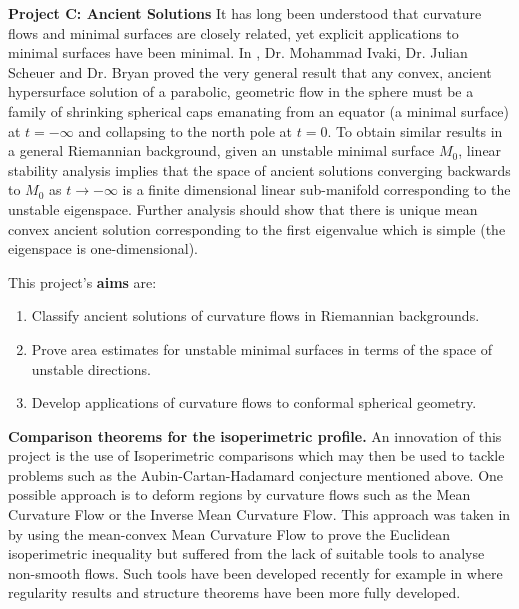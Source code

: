 \documentclass[12pt]{amsart}
\begin{document}
\noindent\textbf{Project C: Ancient Solutions}
\label{sec-2-3}
It has long been understood that curvature flows and minimal surfaces are closely related, yet explicit applications to minimal surfaces have been minimal. In \cite{2016arXiv160401694B}, Dr. Mohammad Ivaki, Dr. Julian Scheuer and Dr. Bryan proved the very general result that any convex, ancient hypersurface solution of a parabolic, geometric flow in the sphere must be a family of shrinking spherical caps emanating from an equator (a minimal surface) at $t=-\infty$ and collapsing to the north pole at $t=0$. To obtain similar results in a general Riemannian background, given an unstable minimal surface $M_0$, linear stability analysis implies that the space of ancient solutions converging backwards to $M_0$ as $t\to-\infty$ is a finite dimensional linear sub-manifold corresponding to the unstable eigenspace. Further analysis should show that there is unique mean convex ancient solution corresponding to the first eigenvalue which is simple (the eigenspace is one-dimensional).

This project's \textbf{aims} are:
\begin{enumerate}[label=\textbf{(C.\arabic*)}]
\item Classify ancient solutions of curvature flows in Riemannian backgrounds.
\item Prove area estimates for unstable minimal surfaces in terms of the space of unstable directions.
\item Develop applications of curvature flows to conformal spherical geometry.
\end{enumerate}

\smallskip{}
\label{sec-3}

\noindent\textbf{Comparison theorems for the isoperimetric profile.}
\label{sec-3-1}
An innovation of this project is the use of Isoperimetric comparisons which may then be used to tackle problems such as the Aubin-Cartan-Hadamard conjecture mentioned above. One possible approach is to deform regions by curvature flows such as the Mean Curvature Flow or the Inverse Mean Curvature Flow. This approach was taken in \cite{MR2420018} by using the mean-convex Mean Curvature Flow to prove the Euclidean isoperimetric inequality but suffered from the lack of suitable tools to analyse non-smooth flows. Such tools have been developed recently for example in \cite{MR3570481,2013arXiv1304.0926H} where regularity results and structure theorems have been more fully developed.
\end{document}
